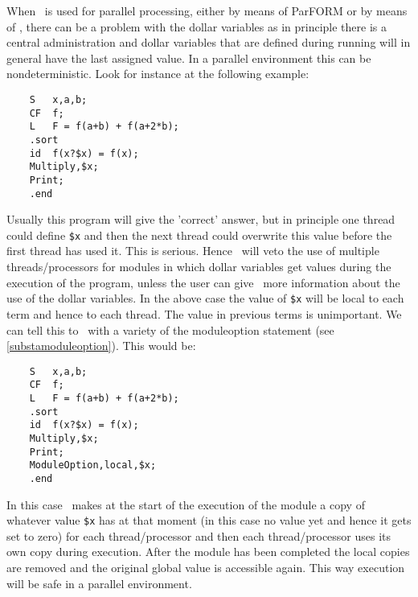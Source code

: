 When \FORM\ is used for parallel processing, 
either by means of ParFORM or by means of 
\TFORM{}, there can be a problem with the dollar variables as in 
principle there is a central administration and dollar variables that are 
defined during running will in general have the last assigned value. In a 
parallel environment this can be nondeterministic. 
Look for instance at the following example:
\begin{verbatim}
    S   x,a,b;
    CF  f;
    L   F = f(a+b) + f(a+2*b);
    .sort
    id  f(x?$x) = f(x);
    Multiply,$x;
    Print;
    .end
\end{verbatim}
Usually this program will give the 'correct' answer, but in principle one 
thread could define \verb:$x: and then the next thread could overwrite this 
value before the first thread has used it. This is serious. Hence \FORM\ 
will veto the use of multiple threads/processors for modules in 
which dollar variables get values during the execution of the program, 
unless the user can give \FORM\ more information about the use of the 
dollar variables. In the above case the value of \verb:$x: will be local to 
each term and hence to each thread\index{thread}. The value in previous 
terms is unimportant. We can tell this to \FORM\ with a variety of the 
moduleoption\index{moduleoption} statement (see \ref{substamoduleoption}). 
This would be:
\begin{verbatim}
    S   x,a,b;
    CF  f;
    L   F = f(a+b) + f(a+2*b);
    .sort
    id  f(x?$x) = f(x);
    Multiply,$x;
    Print;
    ModuleOption,local,$x;
    .end
\end{verbatim}
In this case \FORM\ makes at the start of the execution of the module a copy 
of whatever value \verb:$x: has at that moment (in this case no value yet 
and hence it gets set to zero) for each thread/processor and then each 
thread/processor uses its own copy during execution. After the module has 
been completed the local copies are removed and the original global value 
is accessible again. This way execution will be safe in a parallel 
environment.

